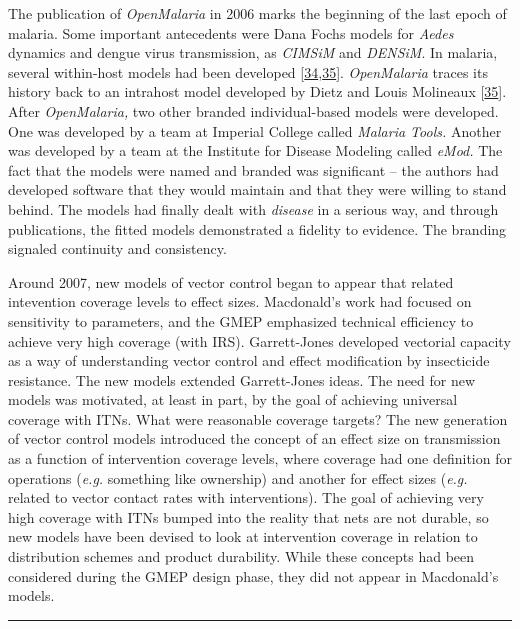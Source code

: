 \documentclass[
]{book}
\begin{document}
The publication of \emph{OpenMalaria} in 2006 marks the beginning of the last epoch of malaria. Some important antecedents were Dana Fochs models for \emph{Aedes} dynamics and dengue virus transmission, as \emph{CIMSiM} and \emph{DENSiM}. In malaria, several within-host models had been developed {[}\protect\hyperlink{ref-MolineauxL1999ReviewIntrahost}{34},\protect\hyperlink{ref-MolineauxL2001PlasmodiumFalciparum}{35}{]}. \emph{OpenMalaria} traces its history back to an intrahost model developed by Dietz and Louis Molineaux {[}\protect\hyperlink{ref-MolineauxL2001PlasmodiumFalciparum}{35}{]}. After \emph{OpenMalaria,} two other branded individual-based models were developed. One was developed by a team at Imperial College called \emph{Malaria Tools.} Another was developed by a team at the Institute for Disease Modeling called \emph{eMod.} The fact that the models were named and branded was significant -- the authors had developed software that they would maintain and that they were willing to stand behind. The models had finally dealt with \emph{disease} in a serious way, and through publications, the fitted models demonstrated a fidelity to evidence. The branding signaled continuity and consistency.

Around 2007, new models of vector control began to appear that related intevention coverage levels to effect sizes. Macdonald's work had focused on sensitivity to parameters, and the GMEP emphasized technical efficiency to achieve very high coverage (with IRS). Garrett-Jones developed vectorial capacity as a way of understanding vector control and effect modification by insecticide resistance. The new models extended Garrett-Jones ideas. The need for new models was motivated, at least in part, by the goal of achieving universal coverage with ITNs. What were reasonable coverage targets? The new generation of vector control models introduced the concept of an effect size on transmission as a function of intervention coverage levels, where coverage had one definition for operations (\emph{e.g.} something like ownership) and another for effect sizes (\emph{e.g.} related to vector contact rates with interventions). The goal of achieving very high coverage with ITNs bumped into the reality that nets are not durable, so new models have been devised to look at intervention coverage in relation to distribution schemes and product durability. While these concepts had been considered during the GMEP design phase, they did not appear in Macdonald's models.

\begin{center}\rule{0.5\linewidth}{0.5pt}\end{center}
\end{document}

